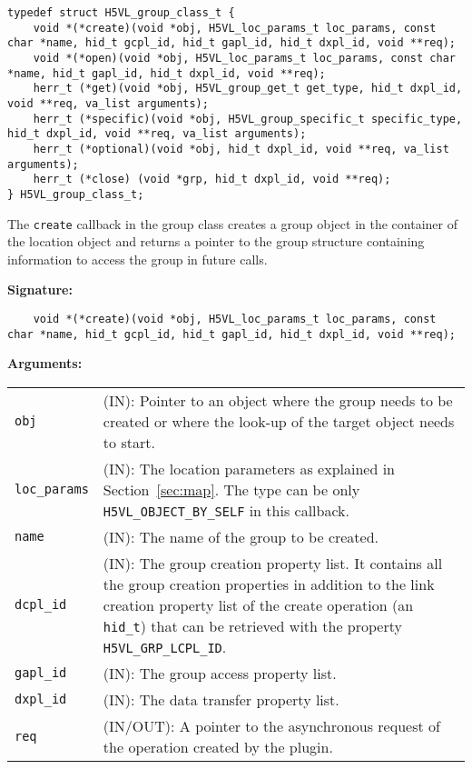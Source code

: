 \begin{lstlisting}[caption={Structure for group callback routines, H5VLpublic.h}, captionpos=b, label={lst:Groupclass}]
typedef struct H5VL_group_class_t {
    void *(*create)(void *obj, H5VL_loc_params_t loc_params, const char *name, hid_t gcpl_id, hid_t gapl_id, hid_t dxpl_id, void **req);
    void *(*open)(void *obj, H5VL_loc_params_t loc_params, const char *name, hid_t gapl_id, hid_t dxpl_id, void **req);
    herr_t (*get)(void *obj, H5VL_group_get_t get_type, hid_t dxpl_id, void **req, va_list arguments);
    herr_t (*specific)(void *obj, H5VL_group_specific_t specific_type, hid_t dxpl_id, void **req, va_list arguments);
    herr_t (*optional)(void *obj, hid_t dxpl_id, void **req, va_list arguments);
    herr_t (*close) (void *grp, hid_t dxpl_id, void **req);
} H5VL_group_class_t;
\end{lstlisting}

The \texttt{create} callback in the group class creates a group
object in the container of the location object and returns a pointer
to the group structure containing information to access the group in
future calls.\bigskip

\begin{mdframed}[style=bgbox]
\textbf{Signature:}
\begin{lstlisting}
    void *(*create)(void *obj, H5VL_loc_params_t loc_params, const char *name, hid_t gcpl_id, hid_t gapl_id, hid_t dxpl_id, void **req);
\end{lstlisting}

\textbf{Arguments:}\\
\begin{tabular}{l p{13.5cm}}
  \texttt{obj} & (IN): Pointer to an object where the group needs
  to be created or where the look-up of the target object needs to
  start.\\
  \texttt{loc\_params} & (IN): The location parameters as explained in
  Section~\ref{sec:map}. The type can be only \texttt{H5VL\_OBJECT\_BY\_SELF} in this callback. \\
  \texttt{name} & (IN): The name of the group to be created.\\
  \texttt{dcpl\_id} & (IN): The group creation property list. It contains
  all the group creation properties in addition to the link creation
  property list of the create operation (an \texttt{hid\_t}) that can be
  retrieved with the property \texttt{H5VL\_GRP\_LCPL\_ID}.\\
  \texttt{gapl\_id} & (IN): The group access property list.\\
  \texttt{dxpl\_id} & (IN): The data transfer property list.\\
  \texttt{req} & (IN/OUT): A pointer to the asynchronous request of the
  operation created by the plugin.\\
\end{tabular}
\end{mdframed}

